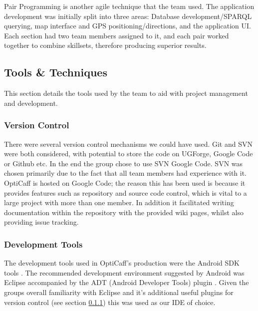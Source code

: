 Pair Programming is another agile technique that the team used. The application development was initially split into three areas: Database development/SPARQL querying, map interface and GPS positioning/directions, and the application UI. Each section had two team members assigned to it, and each pair worked together to combine skillsets, therefore producing superior results. 

\subsection{Tools \& Techniques}
This section details the tools used by the team to aid with project management and development.

\subsubsection{Version Control}
\label{sec:VersionControl}
There were several version control mechanisms we could have used. Git and SVN were both considered, with potential to store the code on UGForge, Google Code or Github etc. In the end the group chose to use SVN Google Code. SVN was chosen primarily due to the fact that all team members had experience with it. OptiCaff is hosted on Google Code; the reason this has been used is because it provides features such as repository and source code control, which is vital to a large project with more than one member. In addition it facilitated writing documentation within the repository with the provided wiki pages, whilst also providing issue tracking. 

\subsubsection{Development Tools}
The development tools used in OptiCaff's production were the Android SDK tools \cite{AndroidSDK}. The recommended development environment suggested by Android was Eclipse \cite{Eclipse} accompanied by the ADT (Android Developer Tools) plugin \cite{SDKAllOS}. Given the groups overall familiarity with Eclipse and it’s additional useful plugins for version control (see section \ref{sec:VersionControl}) this was used as our IDE of choice.